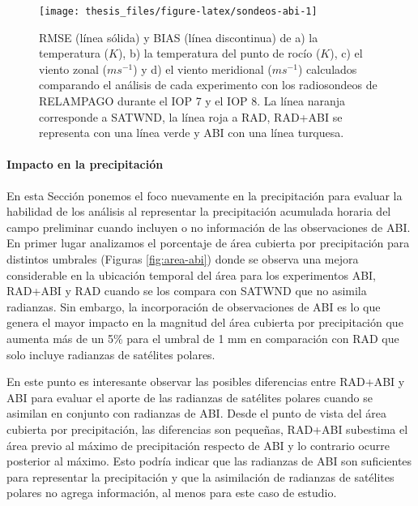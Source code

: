 \documentclass[12pt,oneside,a4paper]{reedthesis}
\begin{document}
\begin{figure}

{\centering \texttt{[image: thesis\_files/figure-latex/sondeos-abi-1]} 

}

\caption{RMSE (línea sólida) y BIAS (línea discontinua) de a) la temperatura (\(K\)), b) la temperatura del punto de rocío (\(K\)), c) el viento zonal (\(m s^{-1}\)) y d) el viento meridional (\(m s^{-1}\)) calculados comparando el análisis de cada experimento con los radiosondeos de RELAMPAGO durante el IOP 7 y el IOP 8. La línea naranja corresponde a SATWND, la línea roja a RAD, RAD+ABI se representa con una línea verde y ABI con una línea turquesa.}\label{fig:sondeos-abi}
\end{figure}
\hypertarget{impacto-en-la-precipitaciuxf3n}{%
\paragraph{Impacto en la precipitación}\label{impacto-en-la-precipitaciuxf3n}}

En esta Sección ponemos el foco nuevamente en la precipitación para evaluar la habilidad de los análisis al representar la precipitación acumulada horaria del campo preliminar cuando incluyen o no información de las observaciones de ABI. En primer lugar analizamos el porcentaje de área cubierta por precipitación para distintos umbrales (Figuras \ref{fig:area-abi}) donde se observa una mejora considerable en la ubicación temporal del área para los experimentos ABI, RAD+ABI y RAD cuando se los compara con SATWND que no asimila radianzas. Sin embargo, la incorporación de observaciones de ABI es lo que genera el mayor impacto en la magnitud del área cubierta por precipitación que aumenta más de un 5\% para el umbral de 1 mm en comparación con RAD que solo incluye radianzas de satélites polares.

En este punto es interesante observar las posibles diferencias entre RAD+ABI y ABI para evaluar el aporte de las radianzas de satélites polares cuando se asimilan en conjunto con radianzas de ABI. Desde el punto de vista del área cubierta por precipitación, las diferencias son pequeñas, RAD+ABI subestima el área previo al máximo de precipitación respecto de ABI y lo contrario ocurre posterior al máximo. Esto podría indicar que las radianzas de ABI son suficientes para representar la precipitación y que la asimilación de radianzas de satélites polares no agrega información, al menos para este caso de estudio.
\end{document}
